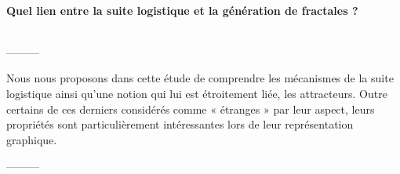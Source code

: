 %
%

\makeatletter
  \begin{flushright}
      {\textbf {\huge \@title}}\\
      {\textbf {\large Quel lien entre la suite logistique et la génération de fractales ?}}\\
    \vspace{1em}
      {\@author}\\
	\vspace{3em}
  \end{flushright}
  \begin{center}
  ---------
  \end{center}
\makeatother
Nous nous proposons dans cette étude de comprendre les mécanismes de la suite logistique
ainsi qu'une notion qui lui est étroitement liée, les attracteurs. Outre certains de ces
derniers considérés comme « étranges » par leur aspect, leurs propriétés sont
particulièrement intéressantes lors de leur représentation graphique.

  \begin{center}
  ---------
  \end{center}
